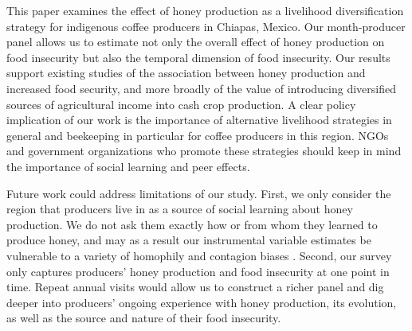 \documentclass[../main.tex]{subfiles}
\begin{document}
This paper examines the effect of honey production as a livelihood diversification strategy for indigenous coffee producers in Chiapas, Mexico. 
Our month-producer panel  allows us to estimate not only the overall effect of honey production on food insecurity but also  the temporal dimension of food insecurity. Our results support existing
studies of the association between honey production and increased food security, and more broadly of the value of introducing diversified sources of agricultural income into cash crop production.  A clear policy implication of our work is the importance of alternative livelihood strategies in general and beekeeping in particular for coffee producers in this region. NGOs and government organizations who promote these strategies should keep in mind the importance of social learning and peer effects. 

Future work could address limitations of our study. First, we only consider the region that producers live in as a source of social learning about honey production. We do not ask them exactly how or from whom they learned to produce honey, and may as a result our instrumental variable estimates be vulnerable to a variety of homophily and contagion biases \parencite{shaliziHomophilyContagionAre2011}.
Second, our survey only captures producers' honey production and food insecurity at one point in time.  Repeat annual visits would allow us to construct a richer panel and dig deeper into producers' ongoing experience with honey production, its evolution, as well as the source and nature of their food insecurity.
\end{document}
